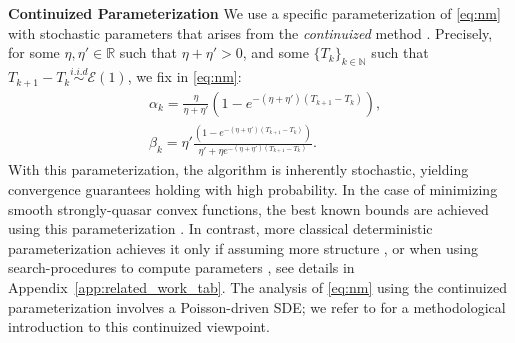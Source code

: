 \documentclass{article}
\def\R{{\mathbb{R}}}
\def\N{{\mathbb{N}}}
\newcommand{\bpar}[1]{\left(#1\right)}
\theoremstyle{plain}
\theoremstyle{definition}
\newtheorem{assumption}[theorem]{Assumption}
\theoremstyle{remark}
\begin{document}
\noindent
\textbf{Continuized Parameterization \:}
We use a specific parameterization of \eqref{eq:nm} with stochastic parameters that arises from the \textit{continuized} method \cite{even2021continuized}. Precisely, for some $\eta,\eta' \in \R$ such that $\eta+\eta'>0$, and some $\{T_k \}_{k \in \N}$ such that $T_{k+1}-T_k \overset{i.i.d}{\sim} \mathcal{E}(1)$, we fix in \eqref{eq:nm}:
\begin{align*}
    &\alpha_k = \frac{\eta}{\eta+\eta'}\bpar{1 -e^{-(\eta + \eta')(T_{k+1}-T_k)} },\\
    &\beta_k = \eta' \frac{\bpar{1- e^{-(\eta+\eta')(T_{k+1}-T_k)}}}{\eta' + \eta e^{-(\eta+\eta')(T_{k+1}-T_k)}}.
\end{align*}
With this parameterization, the algorithm is inherently stochastic, yielding convergence guarantees holding with high probability. 
In the case of minimizing smooth strongly-quasar convex functions, the best known bounds are achieved using this parameterization \cite{wang2023continuized}. In contrast, more classical deterministic parameterization achieves it only if assuming more structure \cite{hermant2024study}, or when using search-procedures to compute parameters \cite{hinder2020near,nesterov2021primal,guminov2023accelerated}, see details in Appendix~\ref{app:related_work_tab}.
The analysis of \eqref{eq:nm} using the continuized parameterization involves a Poisson-driven SDE; we refer to \cite{hermant2025continuized} for a methodological introduction to this continuized viewpoint.
\end{document}
